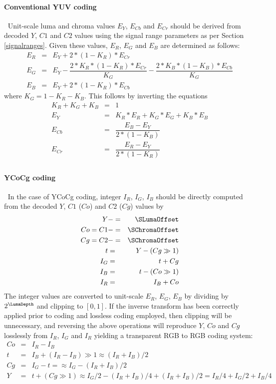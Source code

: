 \begin{informative*}
\paragraph{Conventional YUV coding}
$\ $\newline
Unit-scale luma and chroma values $E_Y$, $E_{Cb}$ and $E_{Cr}$ should be
derived from decoded $Y$, $C1$ and $C2$ values using the signal range parameters
as per Section \ref{signalranges}. Given these values, $E_R$, $E_G$ and $E_B$ are
determined as follows:
\begin{eqnarray*}
E_R & = & E_Y + 2*(1-K_R)*E_{Cr} \\
E_G & = & E_Y - \dfrac{2*K_R*(1-K_R)*E_{Cr}}{K_G}-\dfrac{2*K_B*(1-K_B)*E_{Cb}}{K_G} \\
E_B & = & E_Y + 2*(1-K_R)*E_{Cb} 
\end{eqnarray*}
where $K_G=1-K_R-K_B$.
This follows by inverting the equations 
\begin{eqnarray*}
K_R+K_G+K_B & = & 1 \\
E_Y & = & K_R*E_R+K_G*E_G+K_B*E_B \\
E_{Cb} & = & \dfrac{E_B - E_Y}{2*(1-K_B)} \\
E_{Cr} & = & \dfrac{E_R - E_Y}{2*(1-K_R)} \\
\end{eqnarray*}

\paragraph{YCoCg coding}
$\ $\newline
In the case of YCoCg coding, integer $I_R$, $I_G$, $I_B$ should be directly computed from
the decoded $Y$, $C1$ ($Co$) and $C2$ ($Cg$) values by
\begin{eqnarray*}
Y & -= & \SLumaOffset \\
Co=C1 & -= & \SChromaOffset \\
Cg=C2 & -= & \SChromaOffset \\
t & = & Y-(Cg\gg1) \\
I_G & = & t+Cg \\
I_B & = & t-(Co\gg1) \\
I_R & = & I_B+Co
\end{eqnarray*}
The integer values are converted to unit-scale $E_R$, $E_G$, $E_B$ by dividing by 
$2^\LumaDepth$ and clipping to $[0,1]$.
If the inverse transform has been correctly
applied prior to coding and lossless coding employed, then clipping will
be unnecessary, and reversing the above operations will reproduce $Y$, $Co$ and $Cg$
losslessly from $I_R$, $I_G$ and $I_R$ yielding a transparent RGB to RGB coding system:
\begin{eqnarray*}
Co & = & I_R-I_B \\
t & = & I_B+(I_R-I_B)\gg1 \approx (I_R+I_B)/2\\
Cg & = & I_G-t = \approx I_G-(I_R+I_B)/2\\
Y & = & t+(Cg\gg1) \approx I_G/2-(I_R+I_B)/4+(I_R+I_B)/2=I_R/4+I_G/2+I_B/4
\end{eqnarray*}


\end{informative*}
